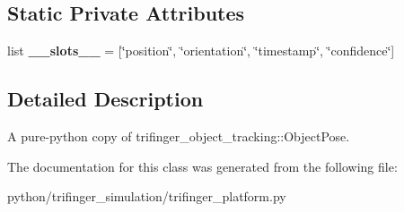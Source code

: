 \subsection*{Static Private Attributes}
\begin{DoxyCompactItemize}
\item 
\mbox{\label{classtrifinger__simulation_1_1trifinger__platform_1_1ObjectPose_a97dcceeb8ec1d615bcbd6ae535a388b1}} 
list {\bfseries \+\_\+\+\_\+slots\+\_\+\+\_\+} = \mbox{[}\char`\"{}position\char`\"{}, \char`\"{}orientation\char`\"{}, \char`\"{}timestamp\char`\"{}, \char`\"{}confidence\char`\"{}\mbox{]}
\end{DoxyCompactItemize}


\subsection{Detailed Description}
A pure-\/python copy of trifinger\+\_\+object\+\_\+tracking\+::\+Object\+Pose. 



The documentation for this class was generated from the following file\+:\begin{DoxyCompactItemize}
\item 
python/trifinger\+\_\+simulation/trifinger\+\_\+platform.\+py\end{DoxyCompactItemize}
